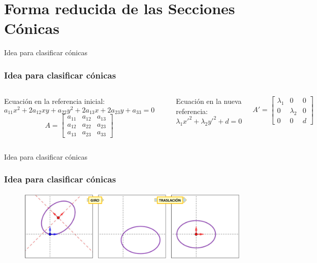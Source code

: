\documentclass[xcolor={dvipsnames},aspectratio=169,10pt]{beamer}
\begin{document}
\section{Forma reducida de las Secciones Cónicas}
\begin{frame}{Idea para clasificar cónicas}
  \frametitle{Idea para clasificar cónicas}
  
  \begin{columns}
    Ecuación en la referencia inicial:
    \begin{equation*}
      a_{11}x^2 + 2a_{12}xy + a_{22}y^2 + 2a_{13}x + 2a_{23}y + a_{33} = 0
    \end{equation*}
    \begin{equation*}
      A = \begin{bmatrix}
        a_{11} & a_{12} & a_{13} \\
        a_{12} & a_{22} & a_{23} \\
        a_{13} & a_{23} & a_{33}
      \end{bmatrix}
    \end{equation*}

    \begin{center}
    \end{center}

    Ecuación en la nueva referencia:
    \begin{equation*}
      \lambda_1x'^2 + \lambda_2y'^2 + d= 0
    \end{equation*}

    \begin{equation*}
      A' = \begin{bmatrix}
        \lambda_1 & 0 & 0 \\
        0 & \lambda_2 & 0 \\
        0 & 0 & d
      \end{bmatrix}
    \end{equation*}
  \end{columns}
\end{frame}

\begin{frame}{Idea para clasificar cónicas}
  \frametitle{Idea para clasificar cónicas}
  \begin{figure}
    \includegraphics[width=\textwidth, height=\textheight, keepaspectratio]{images/red.png}
  \end{figure}
\end{frame}
\end{document}
